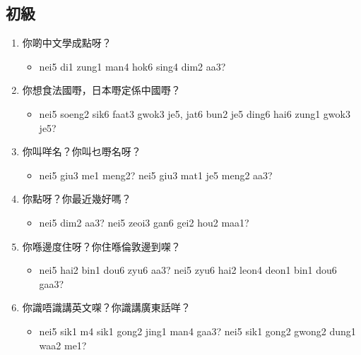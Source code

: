 \documentclass[12pt,a4paper]{leaflet}
\begin{document}
\begin{tcolorbox}[enhanced, breakable, skin first=enhanced, skin middle=enhanced, skin last=enhanced,colback=LightGreen!20!white, colframe=LightGreen!50!black, boxrule=0.5mm]
\subsection*{初級}
\begin{enumerate}[label={},leftmargin=0pt, itemindent=0pt]
\item \LARGE{你啲中文學成點呀？}
\begin{itemize}[label={},leftmargin=0pt, itemindent=0pt]
\item \footnotesize\textsf{nei5 di1 zung1 man4 hok6 sing4 dim2 aa3?}
\end{itemize}
\item \LARGE{你想食法國嘢，日本嘢定係中國嘢？}
\begin{itemize}[label={},leftmargin=0pt, itemindent=0pt]
\item \footnotesize\textsf{nei5 soeng2 sik6 faat3 gwok3 je5, jat6 bun2 je5 ding6 hai6 zung1 gwok3 je5?}
\end{itemize}
\item \LARGE{你叫咩名？你叫乜嘢名呀？}
\begin{itemize}[label={},leftmargin=0pt, itemindent=0pt]
\item \footnotesize\textsf{nei5 giu3 me1 meng2? nei5 giu3 mat1 je5 meng2 aa3?}
\end{itemize}
\item \LARGE{你點呀？你最近幾好嗎？}
\begin{itemize}[label={},leftmargin=0pt, itemindent=0pt]
\item \footnotesize\textsf{nei5 dim2 aa3? nei5 zeoi3 gan6 gei2 hou2 maa1?}
\end{itemize}
\item \LARGE{你喺邊度住呀？你住喺倫敦邊到㗎？}
\begin{itemize}[label={},leftmargin=0pt, itemindent=0pt]
\item \footnotesize\textsf{nei5 hai2 bin1 dou6 zyu6 aa3? nei5 zyu6 hai2 leon4 deon1 bin1 dou6 gaa3?}
\end{itemize}
\item \LARGE{你識唔識講英文㗎？你識講廣東話咩？}
\begin{itemize}[label={},leftmargin=0pt, itemindent=0pt]
\item \footnotesize\textsf{nei5 sik1 m4 sik1 gong2 jing1 man4 gaa3? nei5 sik1 gong2 gwong2 dung1 waa2 me1?}

\end{itemize}
\end{enumerate}
\end{tcolorbox}
\end{document}

